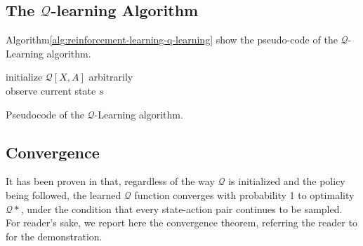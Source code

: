 \subsection{The $\mathcal{Q}$-learning Algorithm}
\label{sec:reinforcement-learning-q-learning-algorithm}
Algorithm\ref{alg:reinforcement-learning-q-learning} show the pseudo-code of the $\mathcal{Q}$-Learning algorithm.

\begin{algorithm}[t]
	\label{alg:reinforcement-learning-q-learning}
	
	
	
	initialize $\mathcal{Q}[X,A]$ arbitrarily \\
	observe current state $s$ \\

	\caption{Pseudocode of the $\mathcal{Q}$-Learning algorithm.}
\end{algorithm}


\subsection{Convergence}
\label{sec:reinforcement-learning-convergence}
It has been proven in \cite{watkins1992q} that, regardless of the way $\mathcal{Q}$ is initialized and the policy being followed, the learned $\mathcal{Q}$ function converges with probability 1 to optimality $\mathcal{Q}*$, under the condition that every state-action pair continues to be sampled.
%
For reader's sake, we report here the convergence theorem, referring the reader to \cite{watkins1992q} for the demonstration.

